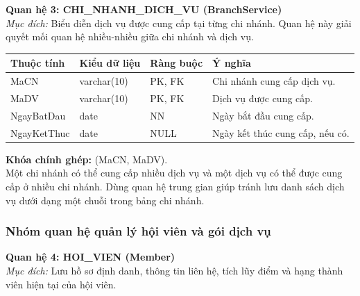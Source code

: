 \documentclass[11pt, a4paper]{article}
\begin{document}
\vspace{0.8em}
\textbf{Quan hệ 3: CHI\_NHANH\_DICH\_VU (BranchService)} \\
\textit{Mục đích:} Biểu diễn dịch vụ được cung cấp tại từng chi nhánh. Quan hệ này giải quyết mối quan hệ nhiều-nhiều giữa chi nhánh và dịch vụ.

\begin{small}
\begin{tabularx}{\textwidth}{| C{2.8cm} | C{2.4cm} | C{2.2cm} | Y |}
\hline
\textbf{Thuộc tính} & \textbf{Kiểu dữ liệu} & \textbf{Ràng buộc} & \textbf{Ý nghĩa} \\
\hline
MaCN & varchar(10) & PK, FK & Chi nhánh cung cấp dịch vụ. \\
\hline
MaDV & varchar(10) & PK, FK & Dịch vụ được cung cấp. \\
\hline
NgayBatDau & date & NN & Ngày bắt đầu cung cấp. \\
\hline
NgayKetThuc & date & NULL & Ngày kết thúc cung cấp, nếu có. \\
\hline
\end{tabularx}
\end{small}

\textbf{Khóa chính ghép:} (MaCN, MaDV). \\
Một chi nhánh có thể cung cấp nhiều dịch vụ và một dịch vụ có thể được cung cấp ở nhiều chi nhánh. Dùng quan hệ trung gian giúp tránh lưu danh sách dịch vụ dưới dạng một chuỗi trong bảng chi nhánh.

\subsubsection{Nhóm quan hệ quản lý hội viên và gói dịch vụ}

\textbf{Quan hệ 4: HOI\_VIEN (Member)} \\
\textit{Mục đích:} Lưu hồ sơ định danh, thông tin liên hệ, tích lũy điểm và hạng thành viên hiện tại của hội viên.
\end{document}

